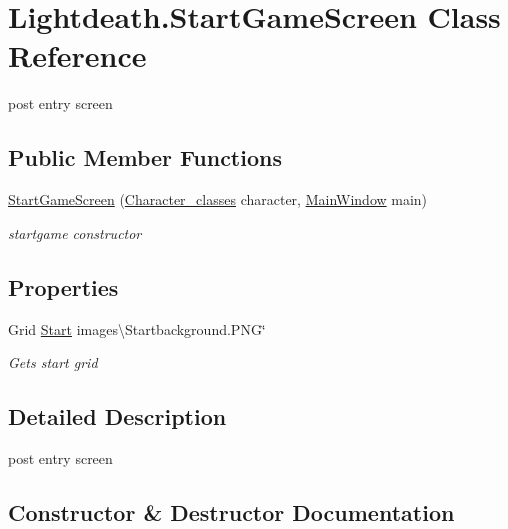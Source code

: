 \hypertarget{class_lightdeath_1_1_start_game_screen}{}\section{Lightdeath.\+Start\+Game\+Screen Class Reference}
\label{class_lightdeath_1_1_start_game_screen}


post entry screen  


\subsection*{Public Member Functions}
\begin{DoxyCompactItemize}
\item 
\hyperlink{class_lightdeath_1_1_start_game_screen_a26699a69a65b0a5269637dd085272500}{Start\+Game\+Screen} (\hyperlink{class_lightdeath_1_1_character__classes}{Character\+\_\+classes} character, \hyperlink{class_lightdeath_1_1_main_window}{Main\+Window} main)
\begin{DoxyCompactList}\small\item\em startgame constructor \end{DoxyCompactList}\end{DoxyCompactItemize}
\subsection*{Properties}
\begin{DoxyCompactItemize}
\item 
Grid \hyperlink{class_lightdeath_1_1_start_game_screen_ac78dec5ea7adc39f8e74fe832f0205e0}{Start} images\textbackslash{}\+Startbackground.\+P\+NG\char`\"{}
\begin{DoxyCompactList}\small\item\em Gets start grid \end{DoxyCompactList}\end{DoxyCompactItemize}


\subsection{Detailed Description}
post entry screen 



\subsection{Constructor \& Destructor Documentation}
\hypertarget{class_lightdeath_1_1_start_game_screen_a26699a69a65b0a5269637dd085272500}{}\label{class_lightdeath_1_1_start_game_screen_a26699a69a65b0a5269637dd085272500} 
